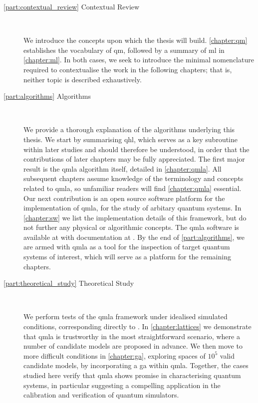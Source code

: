 \begin{description}
    \item[\cref{part:contextual_review} Contextual Review] \
    
        We introduce the concepts upon which the thesis will build. 
        \cref{chapter:qm} establishes the vocabulary of \acrlong{qm}, 
            followed by a summary of \acrlong{ml} in \cref{chapter:ml}. 
        In both cases, we seek to introduce the minimal nomenclature required to 
            contextualise the work in the following chapters;
            that is, neither topic is described exhaustively. 
    
    \item[\cref{part:algorithms} Algorithms] \
    
        We provide a thorough explanation of the algorithms underlying this thesis. 
        We start by summarising \acrlong{qhl}, which serves as a key subroutine within later studies and should therefore 
            be understood, in order that the contributions of later chapters may be fully appreciated.
        The first major result is the \gls{qmla} algorithm itself, 
            detailed in \cref{chapter:qmla}. 
        All subsequent chapters assume knowledge of the terminology and concepts related to \gls{qmla}, 
            so unfamiliar readers will find \cref{chapter:qmla} essential. 
        Our next contribution is an open source software platform for the implementation of \gls{qmla}, 
            for the study of arbitary quantum systems.
        In \cref{chapter:sw} we list the implementation details of this framework, 
            but do not further any physical or algorithmic concepts. 
        The \gls{qmla} software is available at \cite{flynn2021QMLA} with documentation at \cite{qmla_docs}.
        By the end of \cref{part:algorithms}, 
            we are armed with \gls{qmla} as a tool for the inspection of target quantum systems of interest,
            which will serve as a platform for the remaining chapters.
        
    
    \item[\cref{part:theoretical_study} Theoretical Study] \
    
        We perform tests of the \gls{qmla} framework under idealised simulated conditions, 
            corresponding directly to \cite{flynn2021Quantum}. 
        In \cref{chapter:lattices} we demonstrate that \gls{qmla} is trustworthy in the most straightforward scenario, 
            where a number of candidate models are proposed in advance. 
        We then move to more difficult conditions in \cref{chapter:ga}, 
            exploring spaces of $10^5$ valid candidate models, by incorporating a \acrlong{ga} within \gls{qmla}. 
        Together, the cases studied here verify that \gls{qmla} shows promise in characterising quantum systems, 
            in particular suggesting a compelling application in the calibration and verification of quantum simulators. 
    

\end{description}
